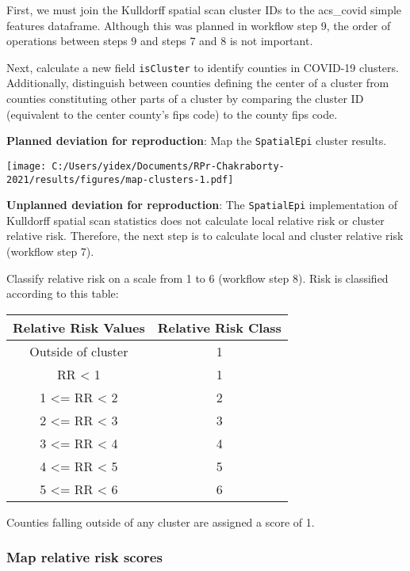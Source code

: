 \documentclass[
]{article}
\begin{document}
First, we must join the Kulldorff spatial scan cluster IDs to the
acs\_covid simple features dataframe. Although this was planned in
workflow step 9, the order of operations between steps 9 and steps 7 and
8 is not important.

Next, calculate a new field \texttt{isCluster} to identify counties in
COVID-19 clusters. Additionally, distinguish between counties defining
the center of a cluster from counties constituting other parts of a
cluster by comparing the cluster ID (equivalent to the center county's
fips code) to the county fips code.

\textbf{Planned deviation for reproduction}: Map the \texttt{SpatialEpi}
cluster results.

\texttt{[image: C:/Users/yidex/Documents/RPr-Chakraborty-2021/results/figures/map-clusters-1.pdf]}

\textbf{Unplanned deviation for reproduction}: The \texttt{SpatialEpi}
implementation of Kulldorff spatial scan statistics does not calculate
local relative risk or cluster relative risk. Therefore, the next step
is to calculate local and cluster relative risk (workflow step 7).

Classify relative risk on a scale from 1 to 6 (workflow step 8). Risk is
classified according to this table:

\begin{longtable}[]{@{}cc@{}}
\toprule\noalign{}
Relative Risk Values & Relative Risk Class \\
\midrule\noalign{}
\endhead
\bottomrule\noalign{}
\endlastfoot
Outside of cluster & 1 \\
RR \textless{} 1 & 1 \\
1 \textless= RR \textless{} 2 & 2 \\
2 \textless= RR \textless{} 3 & 3 \\
3 \textless= RR \textless{} 4 & 4 \\
4 \textless= RR \textless{} 5 & 5 \\
5 \textless= RR \textless{} 6 & 6 \\
\end{longtable}

Counties falling outside of any cluster are assigned a score of 1.

\hypertarget{map-relative-risk-scores}{%
\subsubsection{Map relative risk
scores}\label{map-relative-risk-scores}}
\end{document}

